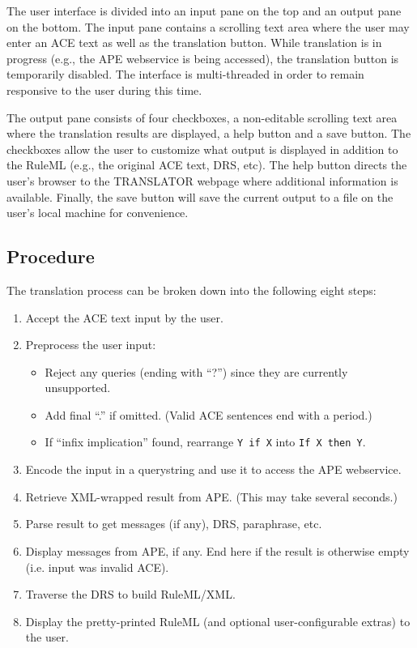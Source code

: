\documentclass[12pt]{article}
\begin{document}
The user interface is divided into an input pane on the top and an output pane on the bottom. The input pane contains a scrolling text area where the user may enter an ACE text as well as the translation button. While translation is in progress (e.g., the APE webservice is being accessed), the translation button is temporarily disabled. The interface is multi-threaded in order to remain responsive to the user during this time.

The output pane consists of four checkboxes, a non-editable scrolling text area where the translation results are displayed, a help button and a save button. The checkboxes allow the user to customize what output is displayed in addition to the RuleML (e.g., the original ACE text, DRS, etc). The help button directs the user's browser to the TRANSLATOR webpage where additional information is available. Finally, the save button will save the current output to a file on the user's local machine for convenience.

\subsection{Procedure}

The translation process can be broken down into the following eight steps:
\begin{enumerate}
\item
Accept the ACE text input by the user.
\item
Preprocess the user input:
	\begin{itemize}
	\item Reject any queries (ending with ``?'') since they are currently unsupported.
	\item Add final ``.'' if omitted. (Valid ACE sentences end with a period.)
	\item If ``infix implication'' found, rearrange \verb|Y if X| into \verb|If X then Y|.
	\end{itemize}
\item
Encode the input in a querystring and use it to access the APE webservice.
\item
Retrieve XML-wrapped result from APE. (This may take several seconds.)
\item
Parse result to get messages (if any), DRS, paraphrase, etc.
\item
Display messages from APE, if any. End here if the result is otherwise empty (i.e. input was invalid ACE).
\item
Traverse the DRS to build RuleML/XML.
\item
Display the pretty-printed RuleML (and optional user-configurable extras) to the user.
\end{enumerate}
\end{document}
